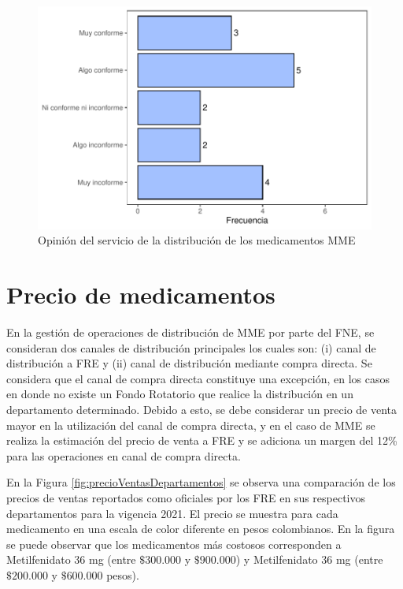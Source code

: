 \documentclass[
]{book}
\begin{document}
\begin{figure}
\includegraphics[width=0.85\linewidth]{InformeFinal_files/figure-latex/TransporteProductos-1} \caption{Opinión del servicio de la distribución de los medicamentos MME}\label{fig:TransporteProductos}
\end{figure}

\hypertarget{precio-de-medicamentos}{%
\section{Precio de medicamentos}\label{precio-de-medicamentos}}

En la gestión de operaciones de distribución de MME por parte del FNE, se consideran dos canales de distribución principales los cuales son: (i) canal de distribución a FRE y (ii) canal de distribución mediante compra directa. Se considera que el canal de compra directa constituye una excepción, en los casos en donde no existe un Fondo Rotatorio que realice la distribución en un departamento determinado. Debido a esto, se debe considerar un precio de venta mayor en la utilización del canal de compra directa, y en el caso de MME se realiza la estimación del precio de venta a FRE y se adiciona un margen del 12\% para las operaciones en canal de compra directa.

En la Figura \ref{fig:precioVentasDepartamentos} se observa una comparación de los precios de ventas reportados como oficiales por los FRE en sus respectivos departamentos para la vigencia 2021. El precio se muestra para cada medicamento en una escala de color diferente en pesos colombianos. En la figura se puede observar que los medicamentos más costosos corresponden a Metilfenidato 36 mg (entre \(\$300.000\) y \(\$900.000\)) y Metilfenidato 36 mg (entre \(\$200.000\) y \(\$600.000\) pesos).
\end{document}
